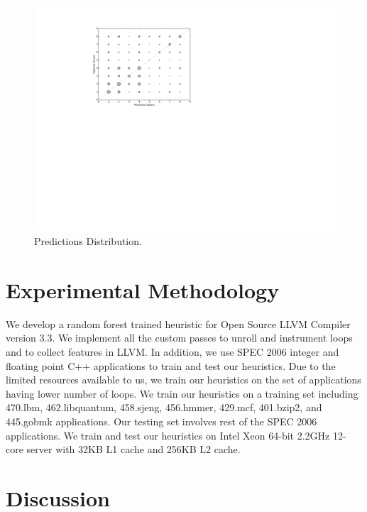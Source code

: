 \documentclass[]{sig-alternate}
\begin{document}
\begin{figure}
  \center
  \includegraphics[width=0.9\linewidth]{fig/mlPredictions.pdf}
  \caption{Predictions Distribution.}
  \label{fig:mlPredictions}
\end{figure}




\section{Experimental Methodology}\label{sec:experimental_methodology}
We develop a random forest trained heuristic for Open Source LLVM Compiler version 3.3. We implement all the custom passes to unroll and instrument loops and to collect features in LLVM. In addition, we use SPEC 2006 integer and floating point C++ applications to train and test our heuristics. Due to the limited resources available to us, we train our heuristics on the set of applications having lower number of loops. We train our heuristics on a training set including 470.lbm, 462.libquantum, 458.sjeng, 456.hmmer, 429.mcf, 401.bzip2, and 445.gobmk applications. Our testing set involves rest of the SPEC 2006 applications. We train and test our heuristics on Intel Xeon 64-bit 2.2GHz 12-core server with 32KB L1 cache and 256KB L2 cache.


\section{Discussion}
\label{sec:Discussion}
\end{document}
